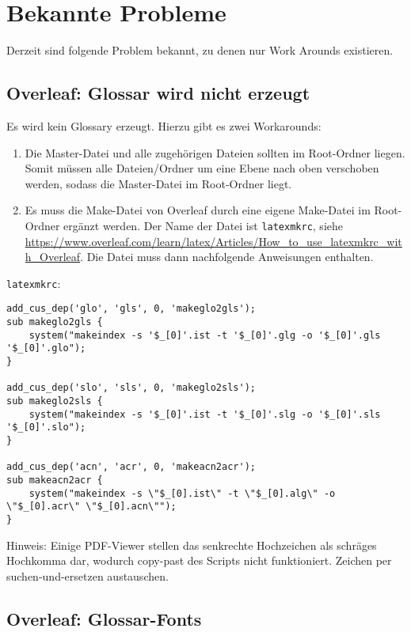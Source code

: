 %
\section{Bekannte Probleme}\label{sec:knownissues}
Derzeit sind folgende Problem bekannt, zu denen nur Work Arounds existieren.

\subsection{Overleaf: Glossar wird nicht erzeugt }\label{sec:knownissues:overleaf_glossary}
Es wird kein Glossary erzeugt. Hierzu gibt es zwei Workarounds:
\begin{enumerate} 
	\item Die Master-Datei und alle zugehörigen Dateien sollten im Root-Ordner liegen. Somit müssen alle Dateien/Ordner um eine Ebene nach oben verschoben werden, sodass die Master-Datei im Root-Ordner liegt.
    \item Es muss die Make-Datei von Overleaf durch eine eigene Make-Datei im Root-Ordner ergänzt werden. Der Name der Datei ist \texttt{latexmkrc}, siehe \url{https://www.overleaf.com/learn/latex/Articles/How_to_use_latexmkrc_with_Overleaf}. Die Datei muss dann nachfolgende Anweisungen enthalten.
\end{enumerate}
    
\texttt{latexmkrc}:
\footnotesize{
\begin{verbatim} 
add_cus_dep('glo', 'gls', 0, 'makeglo2gls');
sub makeglo2gls {
    system("makeindex -s '$_[0]'.ist -t '$_[0]'.glg -o '$_[0]'.gls '$_[0]'.glo");
}

add_cus_dep('slo', 'sls', 0, 'makeglo2sls');
sub makeglo2sls {
    system("makeindex -s '$_[0]'.ist -t '$_[0]'.slg -o '$_[0]'.sls '$_[0]'.slo");
}

add_cus_dep('acn', 'acr', 0, 'makeacn2acr');
sub makeacn2acr {
    system("makeindex -s \"$_[0].ist\" -t \"$_[0].alg\" -o \"$_[0].acr\" \"$_[0].acn\"");
}
\end{verbatim}
}

Hinweis: Einige PDF-Viewer stellen das senkrechte Hochzeichen als schräges Hochkomma dar, wodurch copy-past des Scripts nicht funktioniert. Zeichen per suchen-und-ersetzen austauschen.

\subsection{Overleaf: Glossar-Fonts}\label{sec:knownissues:overleaf_fonts}


